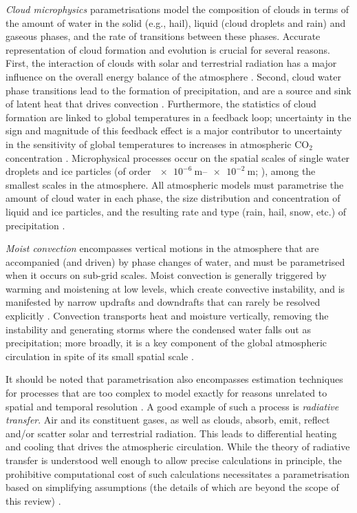 \documentclass[titlepage,twoside]{article}
\numberwithin{equation}{section}
\begin{document}
\emph{Cloud microphysics} parametrisations model the composition of clouds in
terms of the amount of water in the solid (e.g., hail), liquid (cloud droplets
and rain) and gaseous phases, and the rate of transitions between these phases.
Accurate representation of cloud formation and evolution is crucial for several
reasons. First, the interaction of clouds with solar and terrestrial radiation
has a major influence on the overall energy balance of the atmosphere
\parencite{mcfarlane2011}. Second, cloud water phase transitions lead to the
formation of precipitation, and are a source and sink of latent heat that
drives convection \parencite{mcfarlane2011}. Furthermore, the statistics of
cloud formation are linked to global temperatures in a feedback loop;
uncertainty in the sign and magnitude of this feedback effect is a major
contributor to uncertainty in the sensitivity of global temperatures to
increases in atmospheric CO$_2$ concentration \parencite{andrews2012,
christensen2022,stevens2013}. Microphysical processes occur on the spatial
scales of single water droplets and ice particles (of order
$\SIrange{e-6}{e-2}{\meter}$; \textcite{lamb2003}), among the smallest scales
in the atmosphere. All atmospheric models must parametrise the amount of cloud
water in each phase, the size distribution and concentration of liquid and ice
particles, and the resulting rate and type (rain, hail, snow, etc.) of
precipitation \parencite{christensen2022}.

\emph{Moist convection} encompasses vertical motions in the atmosphere that are
accompanied (and driven) by phase changes of water, and must be parametrised
when it occurs on sub-grid scales. Moist convection is generally triggered by
warming and moistening at low levels, which create convective instability, and
is manifested by narrow updrafts and downdrafts that can rarely be resolved
explicitly \parencite{mcfarlane2011}. Convection transports heat and moisture
vertically, removing the instability and generating storms where the condensed
water falls out as precipitation; more broadly, it is a key component of the
global atmospheric circulation in spite of its small spatial scale
\parencite{christensen2022}.

It should be noted that parametrisation also encompasses estimation techniques
for processes that are too complex to model exactly for reasons unrelated to
spatial and temporal resolution \parencite{mcfarlane2011}. A good example of
such a process is \emph{radiative transfer}. Air and its constituent gases, as
well as clouds, absorb, emit, reflect and/or scatter solar and terrestrial
radiation. This leads to differential heating and cooling that drives the
atmospheric circulation. While the theory of radiative transfer is understood
well enough to allow precise calculations in principle, the prohibitive
computational cost of such calculations necessitates a parametrisation based on
simplifying assumptions (the details of which are beyond the scope of this
review) \parencite{christensen2022}.
\end{document}
